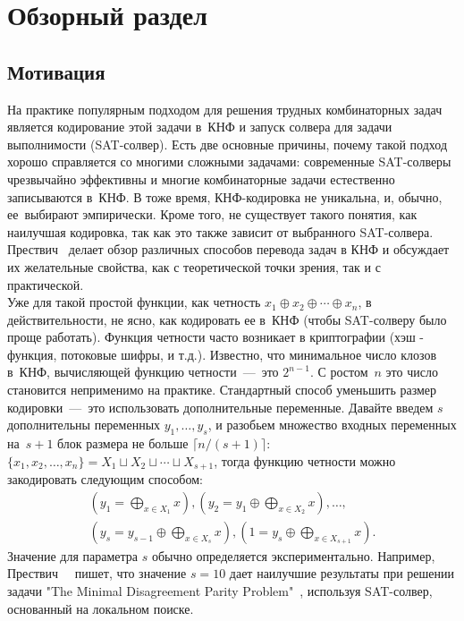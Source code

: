 \section{Обзорный раздел}

\subsection{Мотивация}
На практике популярным подходом для решения трудных комбинаторных задач является кодирование этой задачи в~КНФ и запуск солвера для задачи выполнимости (SAT-солвер). 
Есть две основные причины, почему такой подход хорошо справляется со многими сложными задачами: 
современные SAT-солверы  чрезвычайно эффективны и 
многие комбинаторные задачи естественно записываются в~КНФ. В тоже время, КНФ-кодировка не уникальна, и, обычно, ее~выбирают эмпирически. 
Кроме того, не существует такого понятия, как наилучшая кодировка, так как это также зависит от выбранного SAT-солвера. Прествич~\cite{DBLP:series/faia/Prestwich09} делает обзор различных способов перевода задач в КНФ и обсуждает их желательные свойства, как с теоретической точки зрения, так и с практической. \\
Уже для такой простой функции, как четность $x_1 \oplus x_2 \oplus \dotsb \oplus x_n$, 
в действительности, не ясно, как кодировать ее в~КНФ (чтобы SAT-солверу было проще работать). 
Функция четности часто возникает в криптографии (хэш - функция, потоковые шифры, и т.д.). 
Известно, что минимальное число клозов в~КНФ, вычисляющей функцию четности~---~это $2^{n-1}$. 
С ростом~$n$ это число становится неприменимо на практике. 
Стандартный способ уменьшить размер кодировки~---~это использовать дополнительные переменные. 
Давайте введем $s$ дополнительны переменных $y_1, \dotsc, y_s$, и разобьем множество входных переменных на~$s+1$ блок размера не больше $\lceil n/(s+1) \rceil$: $\{x_1, x_2, \dotsc, x_n\}=X_1 \sqcup X_2 \sqcup \dotsb \sqcup X_{s+1}$, 
тогда функцию четности можно закодировать следующим способом: 
\begin{multline}\label{eq:blocks}
	\left(y_1=\bigoplus_{x \in X_1}x\right),
	\left(y_2=y_1 \oplus \bigoplus_{x \in X_2}x\right), \dotsc,\\
	\left(y_s=y_{s-1} \oplus \bigoplus_{x \in X_s}x\right),
	\left(1=y_s \oplus \bigoplus_{x \in X_{s+1}}x\right).
\end{multline}
Значение для параметра $s$ обычно определяется экспериментально. Например, Прествич~~\cite{DBLP:series/faia/Prestwich09} пишет, что значение $s = 10$ дает наилучшие результаты при решении задачи "The Minimal Disagreement Parity Problem"\ \cite{Crawford1995TheMD}, используя SAT-солвер, основанный на локальном поиске.

